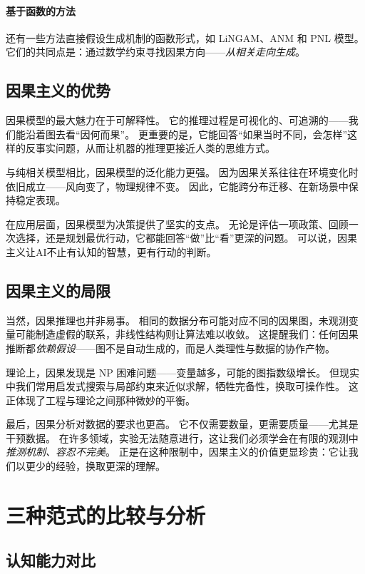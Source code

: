\paragraph{基于函数的方法}
还有一些方法直接假设生成机制的函数形式，如 LiNGAM、ANM 和 PNL 模型。  
它们的共同点是：通过数学约束寻找因果方向——\emph{从相关走向生成}。

\subsection{因果主义的优势}

因果模型的最大魅力在于可解释性。  
它的推理过程是可视化的、可追溯的——我们能沿着图去看“因何而果”。  
更重要的是，它能回答“如果当时不同，会怎样”这样的反事实问题，从而让机器的推理更接近人类的思维方式。

与纯相关模型相比，因果模型的泛化能力更强。  
因为因果关系往往在环境变化时依旧成立——风向变了，物理规律不变。  
因此，它能跨分布迁移、在新场景中保持稳定表现。

在应用层面，因果模型为决策提供了坚实的支点。  
无论是评估一项政策、回顾一次选择，还是规划最优行动，它都能回答“做”比“看”更深的问题。  
可以说，因果主义让AI不止有认知的智慧，更有行动的判断。

\subsection{因果主义的局限}

当然，因果推理也并非易事。  
相同的数据分布可能对应不同的因果图，未观测变量可能制造虚假的联系，非线性结构则让算法难以收敛。  
这提醒我们：任何因果推断都\emph{依赖假设}——图不是自动生成的，而是人类理性与数据的协作产物。

理论上，因果发现是 NP 困难问题——变量越多，可能的图指数级增长。  
但现实中我们常用启发式搜索与局部约束来近似求解，牺牲完备性，换取可操作性。  
这正体现了工程与理论之间那种微妙的平衡。

最后，因果分析对数据的要求也更高。  
它不仅需要数量，更需要质量——尤其是干预数据。  
在许多领域，实验无法随意进行，这让我们必须学会在有限的观测中\emph{推测机制、容忍不完美}。  
正是在这种限制中，因果主义的价值更显珍贵：它让我们以更少的经验，换取更深的理解。

\section{三种范式的比较与分析}

\subsection{认知能力对比}

